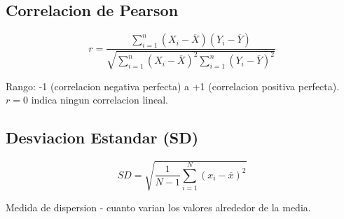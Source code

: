 \subsection*{Correlacion de Pearson}

$$r = \frac{\sum_{i=1}^{n} (X_i - \overline{X})(Y_i - \overline{Y})}{\sqrt{\sum_{i=1}^{n} (X_i - \overline{X})^2 \sum_{i=1}^{n} (Y_i - \overline{Y})^2}}$$

Rango: -1 (correlacion negativa perfecta) a +1 (correlacion positiva perfecta).
$r = 0$ indica ningun correlacion lineal.

\subsection*{Desviacion Estandar (SD)}

$$SD = \sqrt{\frac{1}{N-1} \sum_{i=1}^{N} (x_i - \overline{x})^2}$$

Medida de dispersion - cuanto varian los valores alrededor de la media.
